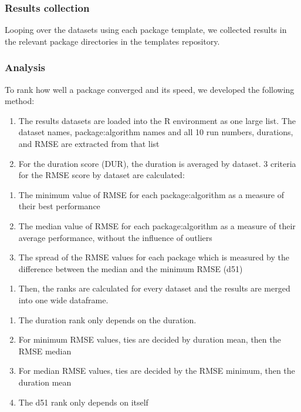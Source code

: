 \hypertarget{results-collection}{%
\subsubsection{Results collection}\label{results-collection}}

Looping over the datasets using each package template, we collected
results in the relevant package directories in the templates repository.

\hypertarget{analysis}{%
\subsubsection{Analysis}\label{analysis}}

To rank how well a package converged and its speed, we developed the
following method:

\begin{enumerate}
\def\labelenumi{\arabic{enumi}.}
\tightlist
\item
  The results datasets are loaded into the R environment as one large
  list. The dataset names, package:algorithm names and all 10 run
  numbers, durations, and RMSE are extracted from that list
\item
  For the duration score (DUR), the duration is averaged by dataset. 3
  criteria for the RMSE score by dataset are calculated:
\end{enumerate}

\begin{enumerate}
\def\labelenumi{\alph{enumi}.}
\tightlist
\item
  The minimum value of RMSE for each package:algorithm as a measure of
  their best performance
\item
  The median value of RMSE for each package:algorithm as a measure of
  their average performance, without the influence of outliers
\item
  The spread of the RMSE values for each package which is measured by
  the difference between the median and the minimum RMSE (d51)
\end{enumerate}

\begin{enumerate}
\def\labelenumi{\arabic{enumi}.}
\setcounter{enumi}{2}
\tightlist
\item
  Then, the ranks are calculated for every dataset and the results are
  merged into one wide dataframe.
\end{enumerate}

\begin{enumerate}
\def\labelenumi{\alph{enumi}.}
\tightlist
\item
  The duration rank only depends on the duration.
\item
  For minimum RMSE values, ties are decided by duration mean, then the
  RMSE median
\item
  For median RMSE values, ties are decided by the RMSE minimum, then the
  duration mean
\item
  The d51 rank only depends on itself
\end{enumerate}

